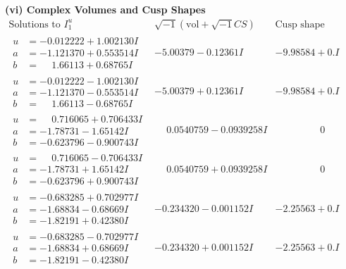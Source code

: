 \documentclass[1p]{elsarticle_modified}
\theoremstyle{definition}
\newcommand{\I}{\sqrt{-1}}
\begin{document}
\newpage\flushleft \textbf{(vi) Complex Volumes and Cusp Shapes}
$$\begin{array}{c|c|c}  
\text{Solutions to }I^u_{1}& \I (\text{vol} + \sqrt{-1}CS) & \text{Cusp shape}\\
 \hline 
\begin{aligned}
u &= -0.012222 + 1.002130 I \\
a &= -1.121370 + 0.553514 I \\
b &= \phantom{-}1.66113 + 0.68765 I\end{aligned}
 & -5.00379 - 0.12361 I & -9.98584 + 0. I\phantom{ +0.000000I} \\ \hline\begin{aligned}
u &= -0.012222 - 1.002130 I \\
a &= -1.121370 - 0.553514 I \\
b &= \phantom{-}1.66113 - 0.68765 I\end{aligned}
 & -5.00379 + 0.12361 I & -9.98584 + 0. I\phantom{ +0.000000I} \\ \hline\begin{aligned}
u &= \phantom{-}0.716065 + 0.706433 I \\
a &= -1.78731 - 1.65142 I \\
b &= -0.623796 - 0.900743 I\end{aligned}
 & \phantom{-}0.0540759 - 0.0939258 I & \phantom{-0.000000 } 0 \\ \hline\begin{aligned}
u &= \phantom{-}0.716065 - 0.706433 I \\
a &= -1.78731 + 1.65142 I \\
b &= -0.623796 + 0.900743 I\end{aligned}
 & \phantom{-}0.0540759 + 0.0939258 I & \phantom{-0.000000 } 0 \\ \hline\begin{aligned}
u &= -0.683285 + 0.702977 I \\
a &= -1.68834 - 0.68669 I \\
b &= -1.82191 + 0.42380 I\end{aligned}
 & -0.234320 - 0.001152 I & -2.25563 + 0. I\phantom{ +0.000000I} \\ \hline\begin{aligned}
u &= -0.683285 - 0.702977 I \\
a &= -1.68834 + 0.68669 I \\
b &= -1.82191 - 0.42380 I\end{aligned}
 & -0.234320 + 0.001152 I & -2.25563 + 0. I\phantom{ +0.000000I} \\ \hline\begin{aligned}

\end{aligned}
\end{array}$$
\end{document}
